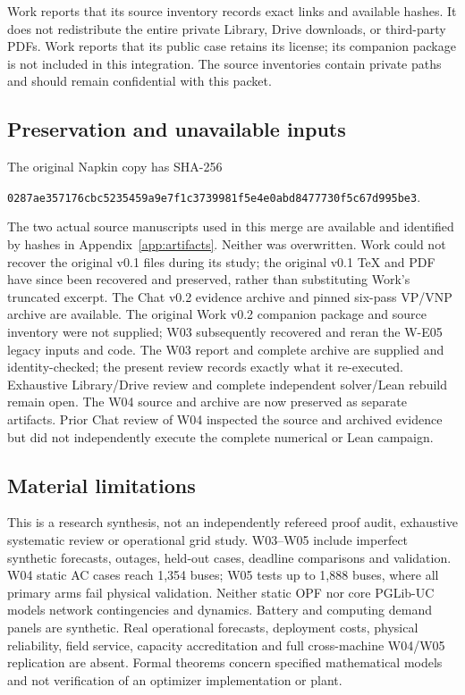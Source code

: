 \documentclass[11pt,letterpaper]{article}
\begin{document}
Work reports that its source inventory records exact links and available hashes. It does not redistribute the entire private Library, Drive downloads, or third-party PDFs. Work reports that its public case retains its license; its companion package is not included in this integration. The source inventories contain private paths and should remain confidential with this packet.

\subsection{Preservation and unavailable inputs}
The original Napkin copy has SHA-256\par\texttt{0287ae357176cbc5235459a9e7f1c37399}\newline\texttt{81f5e4e0abd8477730f5c67d995be3}.\par The two actual source manuscripts used in this merge are available and identified by hashes in Appendix~\ref{app:artifacts}. Neither was overwritten. Work could not recover the original v0.1 files during its study; the original v0.1 TeX and PDF have since been recovered and preserved, rather than substituting Work's truncated excerpt. The Chat v0.2 evidence archive and pinned six-pass VP/VNP archive are available. The original Work v0.2 companion package and source inventory were not supplied; W03 subsequently recovered and reran the W-E05 legacy inputs and code. The W03 report and complete archive are supplied and identity-checked; the present review records exactly what it re-executed. Exhaustive Library/Drive review and complete independent solver/Lean rebuild remain open. The W04 source and archive are now preserved as separate artifacts. Prior Chat review of W04 inspected the source and archived evidence but did not independently execute the complete numerical or Lean campaign.

\subsection{Material limitations}
This is a research synthesis, not an independently refereed proof audit, exhaustive systematic review or operational grid study. W03--W05 include imperfect synthetic forecasts, outages, held-out cases, deadline comparisons and validation. W04 static AC cases reach 1,354 buses; W05 tests up to 1,888 buses, where all primary arms fail physical validation. Neither static OPF nor core PGLib-UC models network contingencies and dynamics. Battery and computing demand panels are synthetic. Real operational forecasts, deployment costs, physical reliability, field service, capacity accreditation and full cross-machine W04/W05 replication are absent. Formal theorems concern specified mathematical models and not verification of an optimizer implementation or plant.
\end{document}
